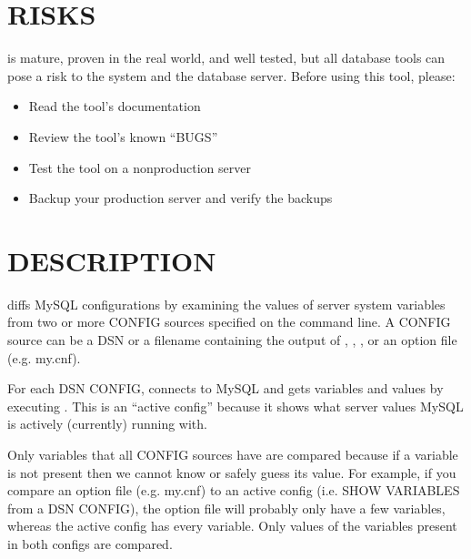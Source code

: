 \documentclass[letterpaper,10pt,english]{sphinxmanual}
\begin{document}
\section{RISKS}
\label{\detokenize{mariadb-config-diff:risks}}
\sphinxAtStartPar
{} is mature, proven in the real world, and well tested,
but all database tools can pose a risk to the system and the database
server.  Before using this tool, please:
\begin{itemize}
\item {} 
\sphinxAtStartPar
Read the tool’s documentation

\item {} 
\sphinxAtStartPar
Review the tool’s known “BUGS”

\item {} 
\sphinxAtStartPar
Test the tool on a non\sphinxhyphen{}production server

\item {} 
\sphinxAtStartPar
Backup your production server and verify the backups

\end{itemize}


\section{DESCRIPTION}
\label{\detokenize{mariadb-config-diff:description}}
\sphinxAtStartPar
{} diffs MySQL configurations by examining the values of server
system variables from two or more CONFIG sources specified on the command
line.  A CONFIG source can be a DSN or a filename containing the output of
, , , or
an option file (e.g. my.cnf).

\sphinxAtStartPar
For each DSN CONFIG,  connects to MySQL and gets variables
and values by executing .  This is
an “active config” because it shows what server values MySQL is
actively (currently) running with.

\sphinxAtStartPar
Only variables that all CONFIG sources have are compared because if a
variable is not present then we cannot know or safely guess its value.
For example, if you compare an option file (e.g. my.cnf) to an active config
(i.e. SHOW VARIABLES from a DSN CONFIG), the option file will probably
only have a few variables, whereas the active config has every variable.
Only values of the variables present in both configs are compared.
\end{document}
